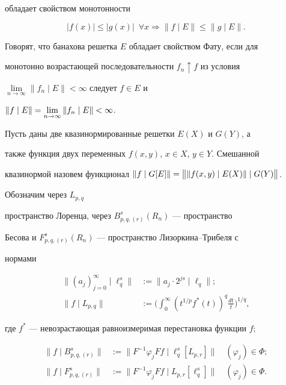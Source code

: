 обладает свойством монотонности


$$


|f(x)| \le |g(x)|\ \; \forall x \Rightarrow \|f\mid E\| \le \|g\mid E\|.


$$





Говорят, что банахова решетка $E$ обладает свойством Фату, если для


монотонно возрастающей последовательности $f_n \uparrow f$ из условия


$\lim\limits_{n\rightarrow \infty }\|f_n\mid E\| <\infty$ следует $f\in E$ и


$\|f\mid E\|=\linebreak


\lim\limits_{n\rightarrow \infty }\|f_n\mid E\| <\infty$.





Пусть даны две квазинормированные решетки $E(X)$ и $G(Y)$, а


также функция двух переменных $f(x,y)$, $x\in X$, $y\in Y$. Смешанной


квазинормой назовем функционал $\|f\mid G[E]\|=\linebreak


\big\| \|f(x,y) \mid E(X)\|\mid G(Y)\big\|$.





Обозначим через $L_{p,q}$


пространство Лоренца, через $B^s_{p,q,(r)}(R_n)$ --- пространство


Бесова и $F^s_{p,q,(r)}(R_n)$ --- пространство Лизоркина--Трибеля с


нормами


\begin{align*}


\|(a_j)^{\infty}_{j=0}\mid\ell^s_q\| &:= \| a_j\cdot 2^{js}\mid\ell_q\|;\\


%


\|f\mid L_{p,q}\| &:= \bigg( \int_0^{\infty} (t^{1/p}


f^*(t))^q\frac{dt}{t} \bigg)^{1/q},


\end{align*}


где $f^*$ --- невозрастающая равноизмеримая перестановка функции $f$;


\begin{align*}


\| f\mid B^s_{p,q,(r)}\| &:=


\| F^{-1}\varphi_j Ff\mid\ell^s_q[L_{p,r}]\|\quad (\varphi_j)\in \Phi ;\\


%


\| f\mid F^s_{p,q,(r)}\| &:= \| F^{-1}\varphi_j Ff\mid L_{p,r}[\ell^s_q]\|


\quad (\varphi_j)\in \Phi.


\end{align*}


